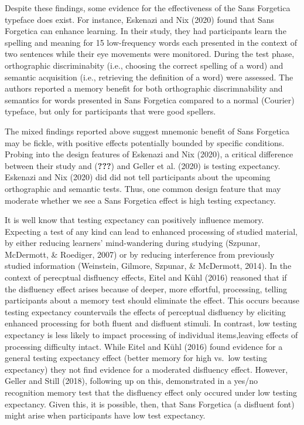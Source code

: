 \documentclass[
  english,
  jou]{apa6}
\begin{document}
Despite these findings, some evidence for the effectiveness of the Sans Forgetica typeface does exist. For instance, Eskenazi and Nix (2020) found that Sans Forgetica can enhance learning. In their study, they had participants learn the spelling and meaning for 15 low-frequency words each presented in the context of two sentences while their eye movements were monitored. During the test phase, orthographic discriminabity (i.e., choosing the correct spelling of a word) and semantic acquisition (i.e., retrieving the definition of a word) were assessed. The authors reported a memory benefit for both orthographic discrimnability and semantics for words presented in Sans Forgetica compared to a normal (Courier) typeface, but only for participants that were good spellers.

The mixed findings reported above suggest mnemonic benefit of Sans Forgetica may be fickle, with positive effects potentially bounded by specific conditions. Probing into the design features of Eskenazi and Nix (2020), a critical difference between their study and ({\textbf{???}}) and Geller et al. (2020) is testing expectancy. Eskenazi and Nix (2020) did did not tell participants about the upcoming orthographic and semantic tests. Thus, one common design feature that may moderate whether we see a Sans Forgetica effect is high testing expectancy.

It is well know that testing expectancy can positively influence memory. Expecting a test of any kind can lead to enhanced processing of studied material, by either reducing learners' mind-wandering during studying (Szpunar, McDermott, \& Roediger, 2007) or by reducing interference from previously studied information (Weinstein, Gilmore, Szpunar, \& McDermott, 2014). In the context of perecptual disfluency effects, Eitel and Kühl (2016) reasoned that if the disfluency effect arises because of deeper, more effortful, processing, telling participants about a memory test should eliminate the effect. This occurs because testing expectancy countervails the effects of perceptual disfluency by eliciting enhanced processing for both fluent and disfluent stimuli. In contrast, low testing expectancy is less likely to impact processing of individual items,leaving effects of processing difficulty intact. While Eitel and Kühl (2016) found evidence for a general testing expectancy effect (better memory for high vs.~low testing expectancy) they not find evidence for a moderated disfluency effect. However, Geller and Still (2018), following up on this, demonstrated in a yes/no recognition memory test that the disfluency effect only occured under low testing expectancy. Given this, it is possible, then, that Sans Forgetica (a disfluent font) might arise when participants have low test expectancy.
\end{document}
